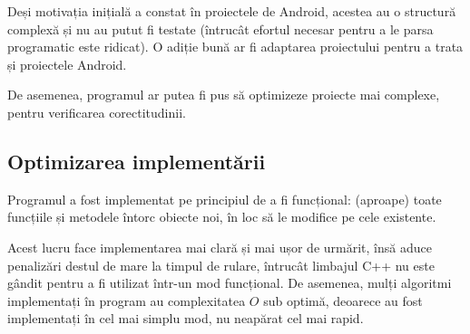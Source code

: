 Deși motivația inițială a constat în proiectele de Android, acestea au o
structură complexă și nu au putut fi testate (întrucât efortul necesar
pentru a le parsa programatic este ridicat). O adiție bună ar fi adaptarea
proiectului pentru a trata și proiectele Android.

De asemenea, programul ar putea fi pus să optimizeze proiecte mai complexe,
pentru verificarea corectitudinii.


\subsection{Optimizarea implementării}
Programul a fost implementat pe principiul de a fi funcțional: (aproape) toate
funcțiile și metodele întorc obiecte noi, în loc să le modifice pe cele
existente.

Acest lucru face implementarea mai clară și mai ușor de urmărit, însă aduce
penalizări destul de mare la timpul de rulare, întrucât limbajul C++ nu este
gândit pentru a fi utilizat într-un mod funcțional.
De asemenea, mulți algoritmi implementați în program au complexitatea $O$
sub optimă, deoarece au fost implementați în cel mai simplu mod, nu neapărat cel
mai rapid.

